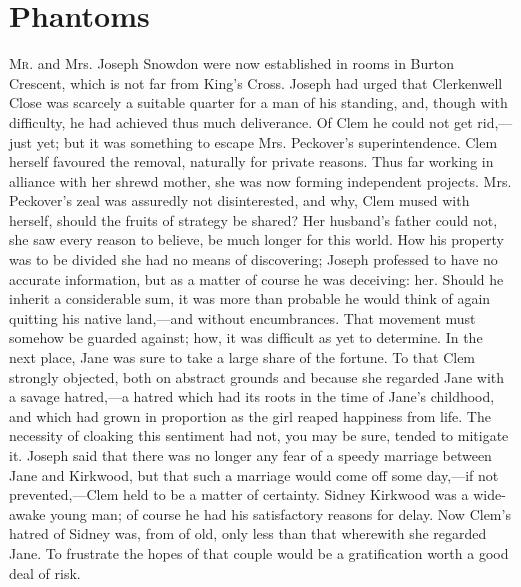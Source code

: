 \chapter{Phantoms}

\textsc{Mr.} and Mrs. Joseph Snowdon were now established in rooms in
Burton Crescent, which is not far from King's Cross. Joseph had urged
that Clerkenwell Close was scarcely a suitable quarter for a man of his
standing, and, though with difficulty, he had achieved thus much
deliverance. Of Clem he could not get rid,---just yet; but it was
something to escape Mrs. Peckover's superintendence. Clem herself
favoured the removal, naturally for private reasons. Thus far working in
alliance with her shrewd mother, she was now forming independent
projects. Mrs. Peckover's zeal was assuredly not disinterested, and why,
Clem mused with herself, should the fruits of strategy be shared? Her
husband's father could not, she saw every reason to believe, be much
longer for this world. How his property
{\protect\hypertarget{25}{}{}}was to be divided she had no means of
discovering; Joseph professed to have no accurate information, but as a
matter of course he was deceiving: her. Should he inherit a considerable
sum, it was more than probable he would think of again quitting his
native land,---and without encumbrances. That movement must somehow be
guarded against; how, it was difficult as yet to determine. In the next
place, Jane was sure to take a large share of the fortune. To that Clem
strongly objected, both on abstract grounds and because she regarded
Jane with a savage hatred,---a hatred which had its roots in the time of
Jane's childhood, and which had grown in proportion as the girl reaped
happiness from life. The necessity of cloaking this sentiment had not,
you may be sure, tended to mitigate it. Joseph said that there was no
longer any fear of a speedy marriage between Jane and Kirkwood, but that
such a marriage would come off some day,---if not prevented,---Clem held
to be a matter of certainty. Sidney Kirkwood was a wide-awake young man;
of course he had his satisfactory reasons for delay. Now Clem's hatred
of Sidney was, from of old, only less than that
{\protect\hypertarget{26}{}{}}wherewith she regarded Jane. To frustrate
the hopes of that couple would be a gratification worth a good deal of
risk.

